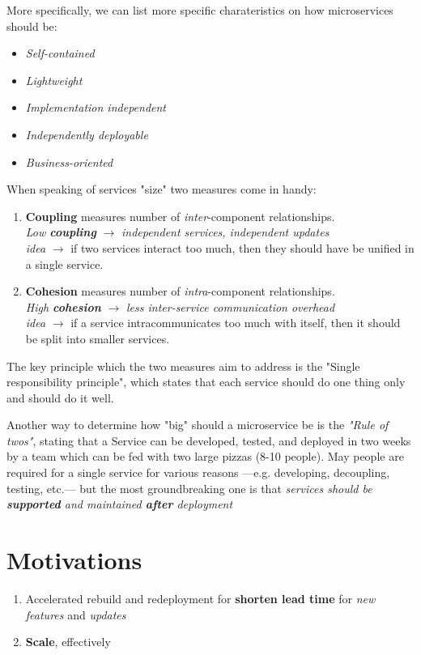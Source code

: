 More specifically, we can list more specific charateristics on how microservices should be:
\begin{itemize}
   \item \textit{Self-contained}
   \item \textit{Lightweight}
   \item \textit{Implementation independent}
   \item \textit{Independently deployable}
   \item \textit{Business-oriented}
\end{itemize}

When speaking of services "size" two measures come in handy:
\begin{enumerate}
   \item 
   \textbf{Coupling} measures number of \textit{inter}-component relationships.\\
   \textit{Low \textbf{coupling}} $\longrightarrow$ \textit{independent services, independent updates}\\
   \textit{idea} $\longrightarrow$ if two services interact too much, then they should have be unified in a single service.
   \item \textbf{Cohesion} measures number of \textit{intra}-component relationships.\\
   \textit{High \textbf{cohesion}} $\longrightarrow$ \textit{less inter-service communication overhead}\\
   \textit{idea} $\longrightarrow$ if a service intracommunicates too much with itself, then it should be split into smaller services.
\end{enumerate}
The key principle which the two measures aim to address is the "Single responsibility principle",
which states that each service should do one thing only and should do it well.

Another way to determine how "big" should a microservice be is the \textit{"Rule of twos"}, stating that a Service can be developed, tested, and deployed in two weeks by a team which can be fed with two large pizzas (8-10 people).
May people are required for a single service for various reasons {---}e.g. developing, decoupling, testing, etc.{---} but
the most groundbreaking one is that \emph{services should be \textbf{supported} and maintained \textbf{after} deployment}

\section{Motivations}
\begin{enumerate}
   \item Accelerated rebuild and redeployment for \textbf{shorten lead time} for \textit{new features} and \textit{updates}
   \item \textbf{Scale}, effectively
\end{enumerate}

